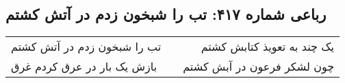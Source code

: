 \begin{center}
\section*{رباعی شماره ۴۱۷: تب را شبخون زدم در آتش کشتم}
\label{sec:sh417}
\begin{longtable}{l p{0.5cm} r}
تب را شبخون زدم در آتش کشتم
&&
یک چند به تعویذ کتابش کشتم
\\
بازش یک بار در عرق کردم غرق
&&
چون لشکر فرعون در آبش کشتم
\\
\end{longtable}
\end{center}
